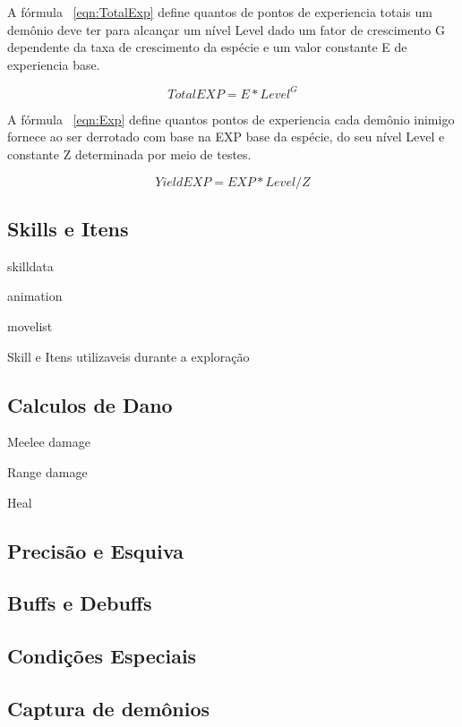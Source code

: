 \documentclass[
	12pt,				%
	openright,			%
	twoside,			%
	a4paper,			%
	english,			%
	french,				%
	spanish,			%
	brazil				%
	]{abntex2}
\begin{document}
	A fórmula ~\ref{eqn:TotalExp} define quantos de pontos de experiencia totais um demônio deve ter para alcançar um nível Level dado um fator de crescimento G dependente da taxa de crescimento da espécie e um valor constante E de experiencia base.
	
\begin{equation}
\label{eqn:TotalExp}
TotalEXP = E * Level^G
\end{equation}

	A fórmula ~\ref{eqn:Exp} define quantos pontos de experiencia cada demônio inimigo fornece ao ser derrotado com base na EXP base da espécie, do seu nível Level e constante Z determinada por meio de testes.
	
\begin{equation}
\label{eqn:Exp}
YieldEXP = EXP * Level/Z
\end{equation}


\subsection{Skills e Itens}

skilldata

animation

movelist

Skill e Itens utilizaveis durante a exploração

\subsection{Calculos de Dano}

Meelee damage

Range damage

Heal

\subsection{Precisão e Esquiva}

\subsection{Buffs e Debuffs}

\subsection{Condições Especiais}

\subsection{Captura de demônios}
\end{document}
